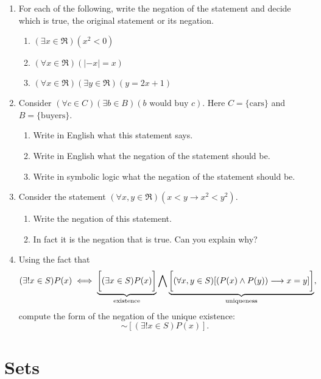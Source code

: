 \begin{enumerate}
\item For each of the following, write the negation of the statement
and decide which is true, the original statement or its negation.
 \begin{enumerate}
 \item $(\exists x\in\Re)(x^2<0)$
 \item $(\forall x\in\Re)(|-x|=x)$
 \item $(\forall x\in\Re)(\exists y\in\Re)(y=2x+1)$
  \end{enumerate}
\item Consider $(\forall c\in C)(\exists b\in B)(b\text{ would buy }c)$.
         Here $C=\{\text{cars}\}$ and $B=\{\text{buyers}\}$.
 \begin{enumerate}
 \item Write in English what this statement says.
 \item Write in English what the negation of the statement should be.
 \item Write in symbolic logic what the negation of the statement
       should be.
 \end{enumerate}
\item Consider the statement $(\forall x,y\in\Re)(x<y\longrightarrow
                                   x^2<y^2)$.
\begin{enumerate}
  \item Write the negation of this statement.
  \item In fact it is the negation that is true.  Can you 
        explain why?
  \end{enumerate}
\item Using the fact that
$$(\exists !x\in S)P(x)
\iff\underbrace{\left[(\exists x\in S)P(x)\vphantom{\frac11}\right]}%
_{\text{existence}}
\bigwedge\underbrace{\left[(\forall x,y\in S)\vphantom{\frac11}
      [(P(x)\wedge P(y))\longrightarrow x=y]\right]}_{\text{uniqueness}},$$
compute the form of the negation of the unique existence:
$$\sim[(\exists !x\in S)P(x)].$$


\end{enumerate}

















\newpage
\section{Sets\label{Sets}}

